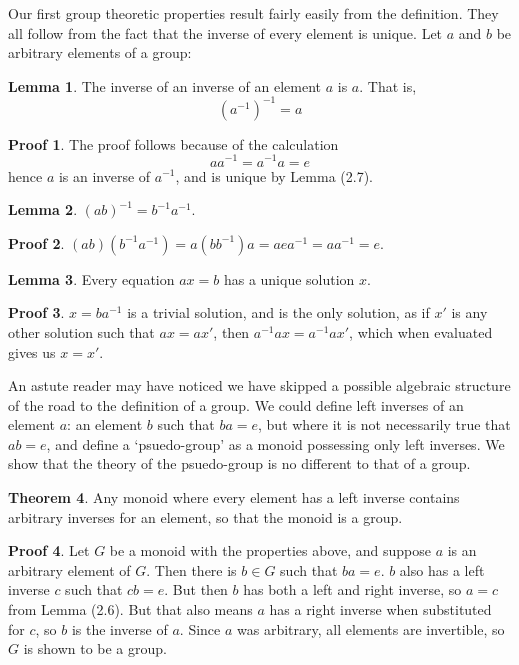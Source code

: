 \documentclass[12pt]{amsbook}
\theoremstyle{definition}
\newtheorem{theorem}{Theorem}[chapter]
\newtheorem{lemma}[theorem]{Lemma}
\newtheorem*{prf}{Proof}
\begin{document}
Our first group theoretic properties result fairly easily from the definition. They all follow from the fact that the inverse of every element is unique. Let $a$ and $b$ be arbitrary elements of a group:

\begin{lemma} The inverse of an inverse of an element $a$ is $a$. That is,
    \[ (a^{-1})^{-1} = a \]
\end{lemma}
\begin{prf}
    The proof follows because of the calculation
    \[a a^{-1} = a^{-1} a = e\]
    hence $a$ is an inverse of $a^{-1}$, and is unique by Lemma (2.7).
\end{prf}

\begin{lemma} $(ab)^{-1} = b^{-1}a^{-1}$. \end{lemma}
\begin{prf} $(ab)(b^{-1}a^{-1}) = a(bb^{-1})a = aea^{-1} = aa^{-1} = e$. \end{prf}

\begin{lemma} Every equation $ax = b$ has a unique solution $x$. \end{lemma}
\begin{prf} $x = ba^{-1}$ is a trivial solution, and is the only solution, as if $x'$ is any other solution such that $ax = ax'$, then $a^{-1}ax = a^{-1}ax'$, which when evaluated gives us $x = x'$.
\end{prf}

An astute reader may have noticed we have skipped a possible algebraic structure of the road to the definition of a group. We could define left inverses of an element $a$: an element $b$ such that $ba = e$, but where it is not necessarily true that $ab = e$, and define a `psuedo-group' as a monoid possessing only left inverses. We show that the theory of the psuedo-group is no different to that of a group.

\begin{theorem}
    Any monoid where every element has a left inverse contains arbitrary inverses for an element, so that the monoid is a group.
\end{theorem}
\begin{prf}
    Let $G$ be a monoid with the properties above, and suppose $a$ is an arbitrary element of $G$. Then there is $b \in G$ such that $ba = e$. $b$ also has a left inverse $c$ such that $cb = e$. But then $b$ has both a left and right inverse, so $a = c$ from Lemma (2.6). But that also means $a$ has a right inverse when substituted for $c$, so $b$ is the inverse of $a$. Since $a$ was arbitrary, all elements are invertible, so $G$ is shown to be a group.
\end{prf}
\end{document}
